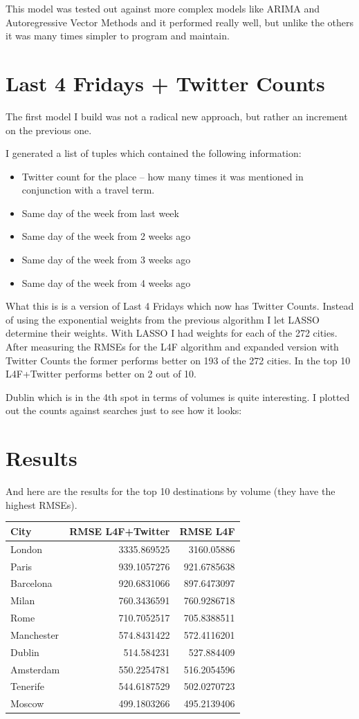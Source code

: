 \documentclass[minf,frontabs,twoside,singlespacing,parskip]{infthesis}
\begin{document}
This model was tested out against more complex models like ARIMA and Autoregressive Vector Methods and it performed really well, but unlike the others it was many times simpler to program and maintain.

\section{Last 4 Fridays + Twitter Counts}

The first model I build was not a radical new approach, but rather an increment on the previous one.

I generated a list of tuples which contained the following information:
\begin{itemize}
\item Twitter count for the place -- how many times it was mentioned in conjunction with a travel term.
\item Same day of the week from last week
\item Same day of the week from 2 weeks ago
\item Same day of the week from 3 weeks ago
\item Same day of the week from 4 weeks ago
\end{itemize}

What this is is a version of Last 4 Fridays which now has Twitter Counts. Instead of using the exponential weights from the previous algorithm I let LASSO determine their weights.
With LASSO I had weights for each of the 272 cities. After measuring the RMSEs for the L4F algorithm and expanded version with Twitter Counts the former performs better on 193 of the 272 cities. In the top 10 L4F+Twitter performs better on 2 out of 10. 

Dublin which is in the 4th spot in terms of volumes is quite interesting. I plotted out the counts against searches just to see how it looks:
%
%
\section{Results}

And here are the results for the top 10 destinations by volume (they have the highest RMSEs).

\begin{tabular}{ l | r | r }
City	& RMSE L4F+Twitter &RMSE L4F \\
\hline
London & 3335.869525 & 3160.05886 \\
Paris	 & 939.1057276 & 921.6785638  \\
Barcelona & 920.6831066 & 897.6473097  \\
Milan & 760.3436591 & 760.9286718  \\
Rome & 710.7052517 & 705.8388511  \\
Manchester & 574.8431422 & 572.4116201  \\
Dublin & 514.584231	 & 527.884409  \\
Amsterdam & 550.2254781 & 516.2054596  \\
Tenerife & 544.6187529 & 502.0270723  \\
Moscow & 499.1803266 & 495.2139406  \\
\end{tabular}
\end{document}

